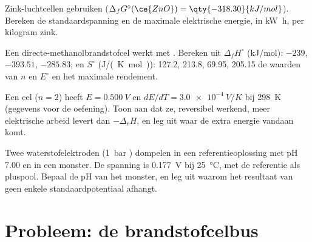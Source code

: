 \begin{exercise}[$\star\star$]\label{exo:b2:cell-thermodynamics:9}
Zink-luchtcellen gebruiken  ($\Delta_f G^\circ(\ce{ZnO}) =
\qty{-318.30}{kJ/mol}$). Bereken de standaardspanning en de maximale elektrische
energie, in \unit{kW.h}, per kilogram zink.
\end{exercise}

\begin{exercise}[$\star\star\star$]\label{exo:b2:cell-thermodynamics:10}
Een directe-methanolbrandstofcel werkt met . Bereken uit
$\Delta_f H^\circ$ (\unit{kJ/mol}):  $-239$,  $-393.51$,
 $-285.83$; en $S^\circ$ (\unit{J/(K.mol)}):  127.2,
 213.8,  69.95,  205.15 de waarden van $n$ en $E^\circ$ en het
maximale rendement.
\end{exercise}

\begin{exercise}[$\star\star\star$]\label{exo:b2:cell-thermodynamics:11}
Een cel ($n = 2$) heeft $E = \qty{0.500}{V}$ en $dE/dT = \qty{+3.0e-4}{V/K}$ bij
\qty{298}{K} (gegevens voor de oefening). Toon aan dat ze, reversibel werkend, meer
elektrische arbeid levert dan $-\Delta_r H$, en leg uit waar de extra energie vandaan komt.
\end{exercise}

\begin{exercise}[$\star\star\star$]\label{exo:b2:cell-thermodynamics:12}
Twee waterstofelektroden (\qty{1}{bar} ) dompelen in een referentieoplossing met
pH 7.00 en in een monster. De spanning is \qty{0.177}{V} bij \qty{25}{\degreeCelsius},
met de referentie als pluspool. Bepaal de pH van het monster, en leg uit
waarom het resultaat van geen enkele standaardpotentiaal afhangt.
\end{exercise}

\section{Probleem: de brandstofcelbus}

